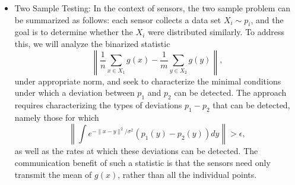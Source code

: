 \begin{itemize}
\item Two Sample Testing: 
In the context of sensors, the two sample problem can be summarized as follows: each sensor collects a data set $X_i\sim p_i$, and the goal is to determine whether the $X_i$ were distributed similarly.  %
To address this, we will analyze the binarized statistic $$\left\|\frac{1}{n}\sum_{x\in X_1} g(x) - \frac{1}{m}\sum_{y\in X_2} g(y)\right\|,$$
under appropriate norm, and seek to characterize the minimal conditions under which a deviation between $p_1$ and $p_2$ can be detected.   The approach requires characterizing the types of deviations $p_1 - p_2$ that can be detected, namely those for which $$\left\|\int e^{-\|x-y\|^2/\sigma^2} (p_1(y) - p_2(y)) dy \right\| > \epsilon,$$ as well as the rates at which these deviations can be detected.
The communication benefit of such a statistic is that the sensors need
only transmit the mean of $g(x)$, rather than all the individual
points.  %


\end{itemize}
